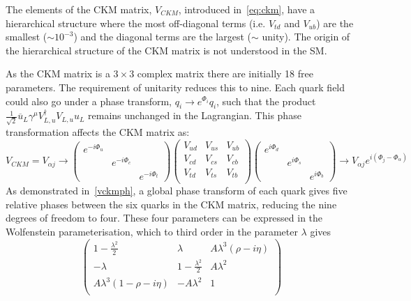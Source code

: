 The elements of the CKM matrix, $V_{CKM}$, introduced in~\autoref{eq:ckm}, have a hierarchical structure where the most off-diagonal terms (i.e. $V_{td}$ and $V_{ub}$) are the smallest ($\sim 10^{-3}$) and the diagonal terms are the largest ($\sim$ unity). The origin of the hierarchical structure of the CKM matrix is not understood in the SM.

As the CKM matrix is a $3\times3$ complex matrix there are initially 18 free parameters. The requirement of unitarity reduces this to nine.
Each quark field could also go under a phase transform, $q_{i}\to e^{\Phi_{i}}q_{i}$, such that the product  $\frac{1}{\sqrt{2}}\overline{u}_{L}\gamma^{\mu}V^{\dagger}_{L,u}V_{L,u}u_{L}$ remains unchanged in the Lagrangian. This phase transformation affects the CKM matrix as:
\begin{equation}
  V_{CKM} = V_{\alpha j} \to \begin{pmatrix}e^{-i\Phi_{u}}&&\\&e^{-i\Phi_{c}}&\\&&e^{-i\Phi_{t}}\end{pmatrix}\begin{pmatrix}V_{ud}&V_{us}&V_{ub}\\V_{cd}&V_{cs}&V_{cb}\\V_{td}&V_{ts}&V_{tb}\\\end{pmatrix} \begin{pmatrix}e^{i\Phi_{d}}&&\\&e^{i\Phi_{s}}&\\&&e^{i\Phi_{b}}\end{pmatrix} \to V_{\alpha j}e^{i(\Phi_{j} - \Phi_{\alpha})}
    \label{vckmph}
\end{equation}
As demonstrated in~\autoref{vckmph}, a global phase transform of each quark gives five relative phases between the six quarks in the CKM matrix, reducing the nine degrees of freedom to four. These four parameters can be expressed in the Wolfenstein parameterisation, which to third order in the parameter $\lambda$ gives ~\cite{wolf}
\begin{equation}
  \begin{pmatrix}1 - \frac{\lambda^{2}}{2} &\lambda& A\lambda^{3}(\rho - i\eta)\\-\lambda&1-\frac{\lambda^{2}}{2} & A\lambda^{2}\\ A\lambda^{3}(1-\rho - i\eta)&-A\lambda^{2}&1\\\end{pmatrix}
\end{equation}
